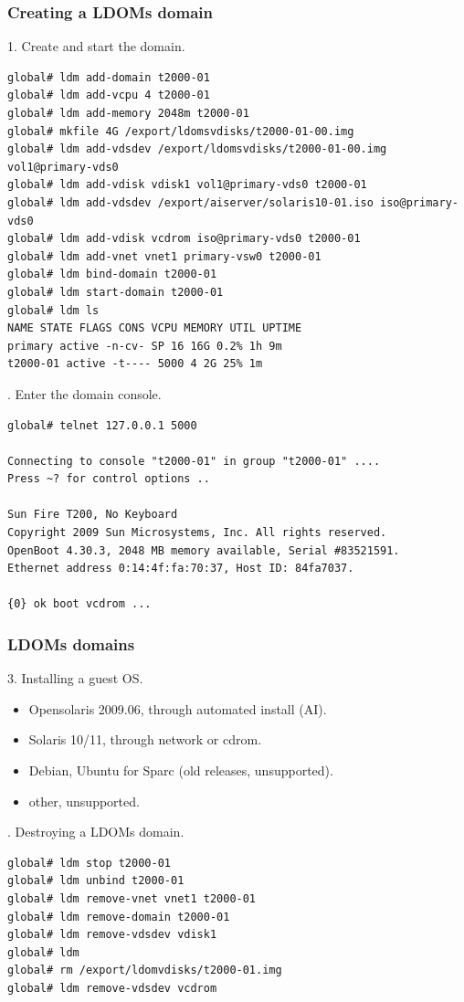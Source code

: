 \documentclass{beamer}
\begin{document}
\begin{frame}[fragile]
\frametitle{Creating a LDOMs domain}

1. Create and start the domain.
\pause
{\tiny
\begin{verbatim}
global# ldm add-domain t2000-01
global# ldm add-vcpu 4 t2000-01
global# ldm add-memory 2048m t2000-01
global# mkfile 4G /export/ldomsvdisks/t2000-01-00.img 
global# ldm add-vdsdev /export/ldomsvdisks/t2000-01-00.img vol1@primary-vds0
global# ldm add-vdisk vdisk1 vol1@primary-vds0 t2000-01
global# ldm add-vdsdev /export/aiserver/solaris10-01.iso iso@primary-vds0
global# ldm add-vdisk vcdrom iso@primary-vds0 t2000-01
global# ldm add-vnet vnet1 primary-vsw0 t2000-01
global# ldm bind-domain t2000-01
global# ldm start-domain t2000-01
global# ldm ls
NAME STATE FLAGS CONS VCPU MEMORY UTIL UPTIME
primary active -n-cv- SP 16 16G 0.2% 1h 9m
t2000-01 active -t---- 5000 4 2G 25% 1m
\end{verbatim}
}
. Enter the domain console.
\pause
{\tiny
\begin{verbatim}
global# telnet 127.0.0.1 5000

Connecting to console "t2000-01" in group "t2000-01" ....
Press ~? for control options ..

Sun Fire T200, No Keyboard
Copyright 2009 Sun Microsystems, Inc. All rights reserved.
OpenBoot 4.30.3, 2048 MB memory available, Serial #83521591.
Ethernet address 0:14:4f:fa:70:37, Host ID: 84fa7037.

{0} ok boot vcdrom ...
\end{verbatim}
}

\end{frame}

\begin{frame}[fragile]
\frametitle{LDOMs domains}

3. Installing a guest OS.
\pause
\begin{itemize}
\item Opensolaris 2009.06, through automated install (AI).
\pause
\item Solaris 10/11, through network or cdrom.
\pause
\item Debian, Ubuntu for Sparc (old releases, unsupported).
\pause
\item other, unsupported.
\end{itemize}
. Destroying a LDOMs domain.
\pause

{\tiny
\begin{verbatim}
global# ldm stop t2000-01
global# ldm unbind t2000-01
global# ldm remove-vnet vnet1 t2000-01
global# ldm remove-domain t2000-01
global# ldm remove-vdsdev vdisk1
global# ldm 
global# rm /export/ldomvdisks/t2000-01.img
global# ldm remove-vdsdev vcdrom
\end{verbatim}
}

\end{frame}
\end{document}
